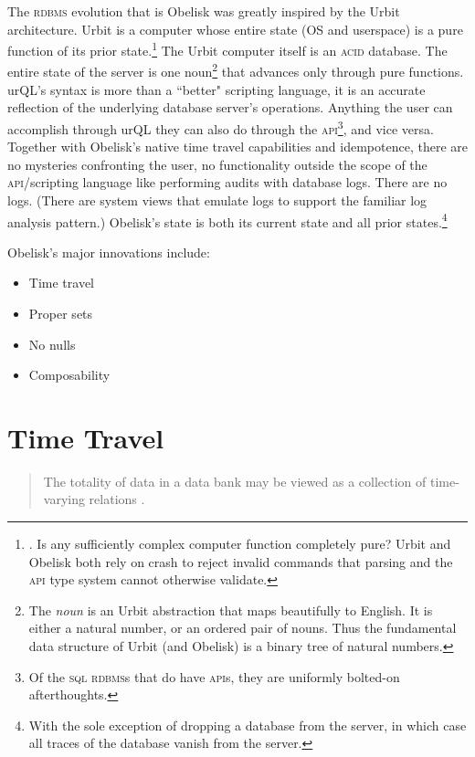 \documentclass[twoside]{article}
\begin{document}
The \textsc{rdbms} evolution that is Obelisk was greatly inspired by the Urbit architecture. Urbit is a computer whose entire state (OS and userspace) is a pure function of its prior state.\footnote{\citet{Whitepaper}. Is any sufficiently complex computer function completely pure? Urbit and Obelisk both rely on crash to reject invalid commands that parsing and the \textsc{api} type system cannot otherwise validate.} The Urbit computer itself is an \textsc{acid} database. The entire state of the server is one noun\footnote{The \emph{noun} is an Urbit abstraction that maps beautifully to English. It is either a natural number, or an ordered pair of nouns. Thus the fundamental data structure of Urbit (and Obelisk) is a binary tree of natural numbers.} that advances only through pure functions. urQL's syntax is more than a ``better" scripting language, it is an accurate reflection of the underlying database server's operations. Anything the user can accomplish through urQL they can also do through the \textsc{api}\footnote{Of the \textsc{sql} \textsc{rdbms}s that do have \textsc{api}s, they are uniformly bolted-on \mbox{afterthoughts}.}, and vice versa. Together with Obelisk's native time travel capabilities and idempotence, there are no mysteries confronting the user, no functionality outside the scope of the \textsc{api}/scripting language like performing audits with database logs. There are no logs. (There are system views that emulate logs to support the familiar log analysis pattern.) Obelisk's state is both its current state and all prior states.\footnote{With the sole exception of dropping a database from the server, in which case all traces of the database vanish from the server.}

Obelisk's major innovations include:

\begin{itemize}
\item Time travel
\item Proper sets
\item No nulls
\item Composability
\end{itemize}

\section{Time Travel}

\begin{quote}
The totality of data in a data bank may be viewed as a collection of time-varying relations \citep{Codd1970}.
\end{quote}
\end{document}
